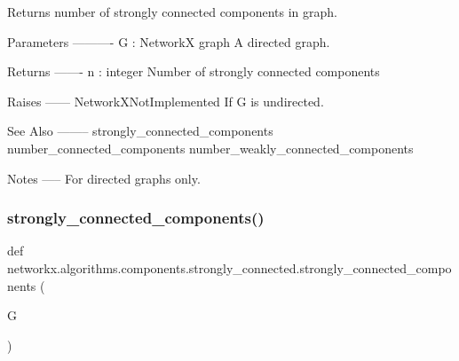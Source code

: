 \begin{DoxyVerb}Returns number of strongly connected components in graph.

Parameters
----------
G : NetworkX graph
   A directed graph.

Returns
-------
n : integer
   Number of strongly connected components

Raises
------
NetworkXNotImplemented
    If G is undirected.

See Also
--------
strongly_connected_components
number_connected_components
number_weakly_connected_components

Notes
-----
For directed graphs only.
\end{DoxyVerb}
 \mbox{\label{namespacenetworkx_1_1algorithms_1_1components_1_1strongly__connected_a02f2798f821d78eee0d035cf82f14b3b}} 
\subsubsection{\texorpdfstring{strongly\+\_\+connected\+\_\+components()}{strongly\_connected\_components()}}
{\footnotesize\ttfamily def networkx.\+algorithms.\+components.\+strongly\+\_\+connected.\+strongly\+\_\+connected\+\_\+components (\begin{DoxyParamCaption}\item[{}]{G }\end{DoxyParamCaption})}

